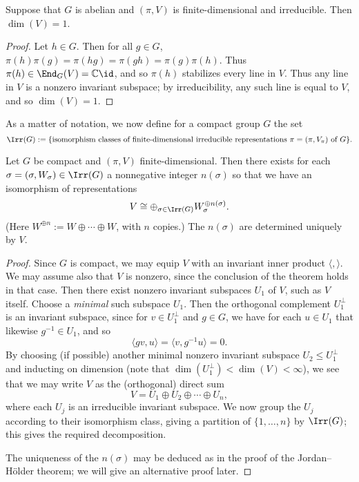 \documentclass[reqno]{amsart} 
\begin{document}
\begin{corollary}\label{cor:schur-ab}
  Suppose that $G$ is abelian and $(\pi,V)$ is finite-dimensional and irreducible.  Then $\dim(V) = 1$.
\end{corollary}
\begin{proof}
  Let $h \in G$.  Then for all $g \in G$, $\pi(h) \pi(g) = \pi(h g) = \pi(g h) = \pi(g) \pi(h)$.  Thus $\pi(h) \in \End_G(V) = \mathbb{C} \id$, and so $\pi(h)$ stabilizes every line in $V$.  Thus any line in $V$ is a nonzero invariant subspace; by irreducibility, any such line is equal to $V$, and so $\dim(V) = 1$.
\end{proof}

As a matter of notation, we now define for a compact group $G$ the set
\begin{equation*}
  \Irr(G) := \{\text{isomorphism classes of finite-dimensional irreducible representations $\pi = (\pi,V_\pi)$ of $G$}\}.
\end{equation*}

\begin{theorem}\label{thm:complete-reducibility-compact-group}
  Let $G$ be compact and $(\pi,V)$ finite-dimensional.  Then there exists for each $\sigma = (\sigma,W_\sigma) \in \Irr(G)$ a nonnegative integer $n(\sigma)$ so that we have an isomorphism of representations
  \begin{equation*}
    V \cong \oplus_{\sigma \in \Irr(G)} W_\sigma^{\oplus n(\sigma)}.
  \end{equation*}
  (Here $W^{\oplus n} := W \oplus \dotsb \oplus W$, with $n$ copies.)  The $n(\sigma)$ are determined uniquely by $V$.
\end{theorem}
\begin{proof}
  Since $G$ is compact, we may equip $V$ with an invariant inner product $\langle , \rangle$.  We may assume also that $V$ is nonzero, since the conclusion of the theorem holds in that case.  Then there exist nonzero invariant subspaces $U_1$ of $V$, such as $V$ itself.  Choose a \emph{minimal} such subspace $U_1$.  Then the orthogonal complement $U_1^\perp$ is an invariant subspace, since for $v \in U_1^\perp$ and $g \in G$, we have for each $u \in U_1$ that likewise $g^{-1} \in U_1$, and so
  \begin{equation*}
    \langle g v, u \rangle = \langle v, g^{-1} u \rangle = 0.
  \end{equation*}
  By choosing (if possible) another minimal nonzero invariant subspace $U_2 \leq U_1^\perp$ and inducting on dimension (note that $\dim(U_1^\perp) < \dim(V) < \infty$), we see that we may write $V$ as the (orthogonal) direct sum
  \begin{equation*}
    V = U_1 \oplus U_2 \oplus \dotsb \oplus U_n,
  \end{equation*}
  where each $U_j$ is an irreducible invariant subspace.  We now group the $U_j$ according to their isomorphism class, giving a partition of $\{1, \dotsc, n\}$ by $\Irr(G)$; this gives the required decomposition.

  The uniqueness of the $n(\sigma)$ may be deduced as in the proof of the Jordan--H{\"o}lder theorem; we will give an alternative proof later.
\end{proof}
\end{document}
